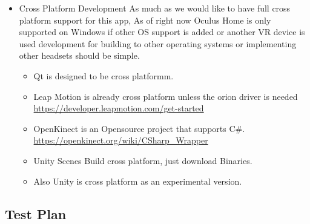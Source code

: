 \documentclass[a4paper,10pt]{article}
\begin{document}
\begin{itemize}
\begin{itemize}
  \end{itemize}
  \item Cross Platform Development
  As much as we would like to have full cross platform support for this app, As of right now 
  Oculus Home is only supported on Windows if other OS support 
  is added or another VR device is used development for building to other operating systems or
  implementing other headsets should be simple.
  \begin{itemize}
  \item Qt is designed to be cross platformm. 
  \item Leap Motion is already cross platform unless the orion driver is needed
  ~\\\url{https://developer.leapmotion.com/get-started}
    \item OpenKinect is an Opensource project that supports C\#.
  \url{https://openkinect.org/wiki/CSharp_Wrapper}
  \item Unity Scenes Build cross platform, just download Binaries.\
  \item Also Unity is cross platform as an experimental version.
  \end{itemize}
\end{itemize}
\pagebreak
\subsection{Test Plan}
\end{document}
